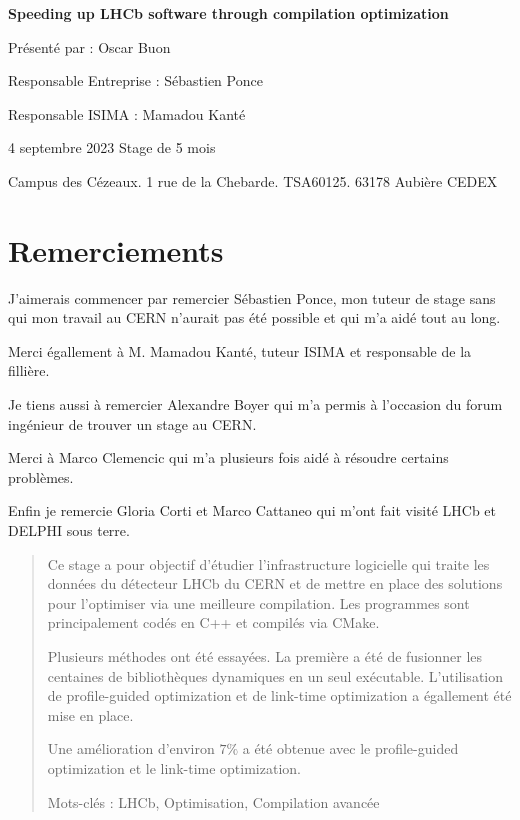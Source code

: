 \documentclass[a4paper]{report}
\begin{document}
\begin{titlepage}
    \vfill

    {\huge\bfseries Speeding up LHCb software through compilation optimization \par}

    \vfill

    {\Large Présenté par : Oscar Buon \par}

    \vfill

    Responsable Entreprise : Sébastien Ponce \par
    Responsable ISIMA : Mamadou Kanté

    \vfill

    4 septembre 2023
    Stage de 5 mois

    \vfill

    Campus des Cézeaux. 1 rue de la Chebarde. TSA60125. 63178 Aubière CEDEX
\end{titlepage}


\chapter*{Remerciements}
J'aimerais commencer par remercier Sébastien Ponce, mon tuteur de stage sans qui mon travail au CERN n'aurait pas été possible et qui m'a aidé tout au long.

Merci égallement à M. Mamadou Kanté, tuteur ISIMA et responsable de la fillière.

\bigskip
Je tiens aussi à remercier Alexandre Boyer qui m'a permis à l'occasion du forum ingénieur de trouver un stage au CERN.

\bigskip
Merci à Marco Clemencic qui m'a plusieurs fois aidé à résoudre certains problèmes.

\bigskip
Enfin je remercie Gloria Corti et Marco Cattaneo qui m'ont fait visité LHCb et DELPHI sous terre.

\tableofcontents

\listoffigures


\begin{abstract}
    Ce stage a pour objectif d'étudier l'infrastructure logicielle qui traite les données du détecteur LHCb du CERN et de mettre en place des solutions pour l'optimiser via une meilleure compilation.
    Les programmes sont principalement codés en C++ et compilés via CMake.

    Plusieurs méthodes ont été essayées.
    La première a été de fusionner les centaines de bibliothèques dynamiques en un seul exécutable.
    L'utilisation de profile-guided optimization et de link-time optimization a égallement été mise en place.

    Une amélioration d'environ $7\%$ a été obtenue avec le profile-guided optimization et le link-time optimization.

    \vfill

    Mots-clés : LHCb, Optimisation, Compilation avancée

\end{abstract}
\end{document}
